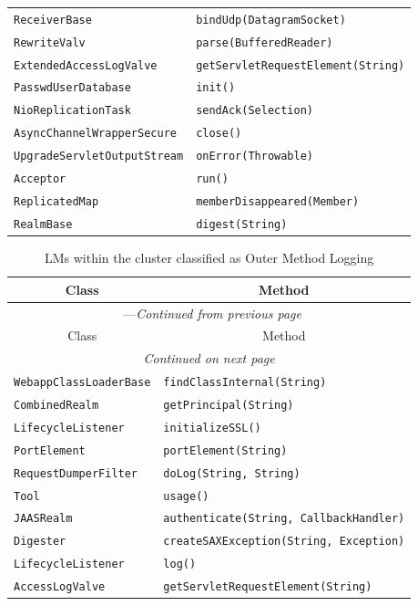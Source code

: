 \begin{center}
\begin{longtable}{ll}
\lstinline/ReceiverBase/&{\lstinline/bindUdp(DatagramSocket)/}\\
\lstinline/RewriteValv/&{\lstinline/parse(BufferedReader)/}\\
\lstinline/ExtendedAccessLogValve/&{\lstinline/getServletRequestElement(String)/}\\
\lstinline/PasswdUserDatabase/&{\lstinline/init()/}\\
\lstinline/NioReplicationTask/&{\lstinline/sendAck(Selection)/}\\
\lstinline/AsyncChannelWrapperSecure/&{\lstinline/close()/}\\
\lstinline/UpgradeServletOutputStream/&{\lstinline/onError(Throwable)/}\\
\lstinline/Acceptor/&{\lstinline/run()/}\\
\lstinline/ReplicatedMap/&{\lstinline/memberDisappeared(Member)/}\\
\lstinline/RealmBase/&{\lstinline/digest(String)/}\\
\end{longtable}
\end{center}

\begin{center}
\begin{longtable}{ll}
\caption{LMs within the cluster classified as Outer Method Logging}\\
\toprule\multicolumn{1}{c}{Class}&\multicolumn{1}{c}{Method}\\\midrule
\endfirsthead

\multicolumn{2}{c}{\tablename\ \thetable{}---\textit{Continued from previous page}} \\\midrule
\multicolumn{1}{c}{Class}&\multicolumn{1}{c}{Method}\\\midrule
\endhead
\multicolumn{2}{c}{\textit{Continued on next page}}\\\midrule
\endfoot
\bottomrule
\endlastfoot

\lstinline/WebappClassLoaderBase/&{\lstinline/findClassInternal(String)/}\\
\lstinline/CombinedRealm/&{\lstinline/getPrincipal(String)/}\\
\lstinline/LifecycleListener/&{\lstinline/initializeSSL()/}\\
\lstinline/PortElement/&{\lstinline/portElement(String)/}\\
\lstinline/RequestDumperFilter/&{\lstinline/doLog(String, String)/}\\
\lstinline/Tool/&{\lstinline/usage()/}\\
\lstinline/JAASRealm/&{\lstinline/authenticate(String, CallbackHandler)/}\\
\lstinline/Digester/&{\lstinline/createSAXException(String, Exception)/}\\
\lstinline/LifecycleListener/&{\lstinline/log()/}\\
\lstinline/AccessLogValve/&{\lstinline/getServletRequestElement(String)/}\\
\end{longtable}
\end{center}

